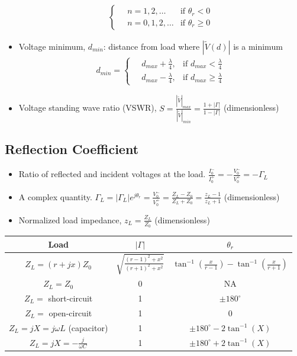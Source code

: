 \documentclass[a4paper]{article}
\begin{document}
\begin{itemize}
\begin{align*}
\begin{cases}
        \quad n = 1, 2, \ldots & \text{if }\theta_r < 0\\
        \quad n = 0, 1, 2, \ldots & \text{if }\theta_r \geq 0
        \end{cases}
    \end{align*}
    \item Voltage minimum, $d_{min}$: distance from load where $|\widetilde{V}(d)|$ is a minimum
    \begin{align*}
        d_{min} = \begin{cases}
        \quad d_{max} + \displaystyle\frac{\lambda}{4}, & \text{if }d_{max} < \displaystyle\frac{\lambda}{4}\\[0.2cm]
        \quad d_{max} - \displaystyle\frac{\lambda}{4}, & \text{if }d_{max} \geq \displaystyle\frac{\lambda}{4}
        \end{cases}
    \end{align*}
    \item Voltage standing wave ratio (VSWR), $S = \displaystyle\frac{|\widetilde{V}|_{max}}{|\widetilde{V}|_{min}} = \displaystyle\frac{1+|\Gamma|}{1-|\Gamma|}$ (dimensionless)
\end{itemize}

\newpage
\subsection{Reflection Coefficient}
\begin{itemize}
    \item Ratio of reflected and incident voltages at the load. \quad $\displaystyle\frac{I_0^-}{I_0^+} = -\displaystyle\frac{V_0^-}{V_0^+} = -\Gamma_L$
    \item A complex quantity. \quad $\Gamma_L =  |\Gamma_L|e^{j\theta_r} = \displaystyle\frac{V_0^-}{V_0^+} = \displaystyle\frac{Z_L-Z_0}{Z_L+Z_0}= \displaystyle\frac{z_L-1}{z_L+1}$ (dimensionless)
    \item Normalized load impedance, $z_L = \displaystyle\frac{Z_L}{Z_0}$ (dimensionless)
\end{itemize}
\begin{table}[H]
\setcellgapes{5pt}
\centering\makegapedcells
\begin{tabular}{c|c|c}
\textbf{Load} & \textbf{$|\Gamma|$} & \textbf{$\theta_r$} \\ \hline
$Z_L = (r+jx)Z_0$ & $\sqrt{\displaystyle\frac{(r-1)^2+x^2}{(r+1)^2+x^2}}$ & $\tan^{-1}\left(\displaystyle\frac{x}{r-1}\right)-\tan^{-1}\left(\displaystyle\frac{x}{r+1}\right)$ \\
$Z_L = Z_0$ & 0 & NA \\
$Z_L =$ short-circuit & 1 & $\pm 180^\circ$ \\
$Z_L =$ open-circuit & 1 & 0 \\
$Z_L = jX = j\omega L$ (capacitor) & 1 & $\pm 180^\circ - 2\tan^{-1}(X)$ \\
$Z_L = jX = -\displaystyle\frac{j}{\omega C}$ & 1 & $\pm 180^\circ + 2\tan^{-1}(X)$                     
\end{tabular}
\end{table}
\end{document}

